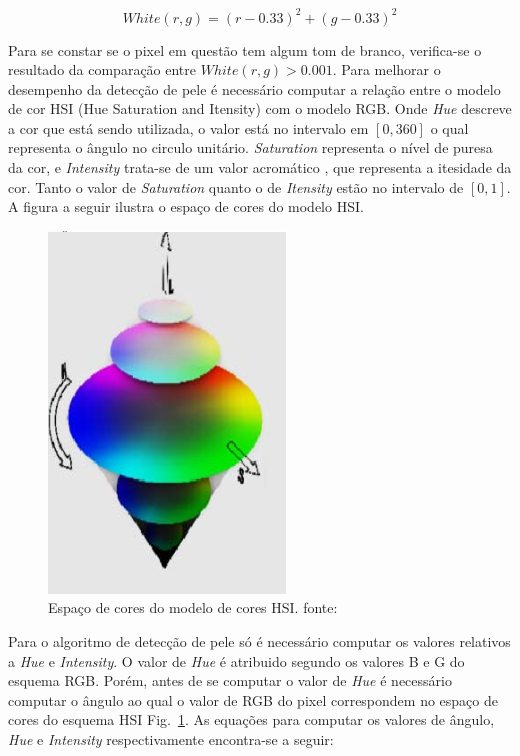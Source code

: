 \documentclass[journal,onecolumn]{IEEEtran}
\begin{document}
	\begin{equation}
		White(r,g) = (r - 0.33)^2 + (g - 0.33)^2 
		\label{eq:whiteValue}
	\end{equation}
	
	Para se constar se o pixel em questão tem algum tom de branco, verifica-se o resultado da comparação entre $White(r,g) > 0.001$.
	Para melhorar o desempenho da detecção de pele é necessário computar a relação entre o modelo de cor HSI (Hue Saturation and Itensity) com o modelo RGB.
	Onde \textit{Hue} descreve a cor que está sendo utilizada, o valor está no intervalo em $[0,360]$ o qual representa o ângulo no circulo unitário.
	\textit{Saturation} representa o nível de puresa da cor, e \textit{Intensity} trata-se de um valor acromático , que representa a itesidade da cor.
	Tanto o valor de \textit{Saturation} quanto o de \textit{Itensity} estão no intervalo de $[0,1]$.
	A figura a seguir ilustra o espaço de cores do modelo HSI. 

		\begin{figure}[htb]
		\begin{center}		
			\includegraphics[scale=0.3]{espaco_hsi.png}
			\caption{Espaço de cores do modelo de cores HSI. fonte:\cite{ibraheem2012understanding} }
			\label{fig:espacoCoresHSI}
		\end{center}
		\end{figure}
	
	Para o algoritmo de detecção de pele só é necessário computar os valores relativos a \textit{Hue} e \textit{Intensity}.
	O valor de \textit{Hue} é atribuido segundo os valores B e G do esquema RGB. 
	Porém, antes de se computar o valor de \textit{Hue} é necessário computar o ângulo ao qual o valor de RGB do pixel correspondem no espaço de cores do esquema HSI Fig.~\ref{fig:espacoCoresHSI}.
	As equações para computar os valores de ângulo, \textit{Hue} e \textit{Intensity} respectivamente encontra-se a seguir:
	
\end{document}
